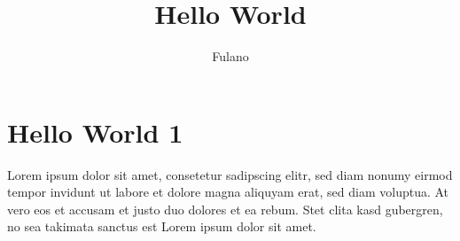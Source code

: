 \documentclass[A4paper, 12pt]{article}
\title{Hello World}
\author{Fulano}
\begin{document}
\maketitle
\tableofcontents


\section{Hello World 1} %

Lorem ipsum dolor sit amet, consetetur sadipscing elitr, sed diam nonumy eirmod
tempor invidunt ut labore et dolore magna aliquyam erat, sed diam voluptua. At
vero eos et accusam et justo duo dolores et ea rebum. Stet clita kasd gubergren,
no sea takimata sanctus est Lorem ipsum dolor sit amet.

\end{document}
